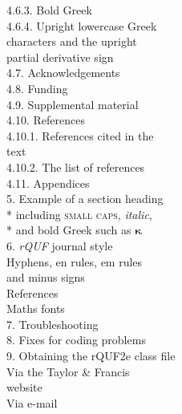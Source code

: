 \documentclass{rQUF2e}
\theoremstyle{plain}
\theoremstyle{definition}
\theoremstyle{remark}
\begin{document}
{{{\hspace*{24pt} {4.6.3.}  Bold Greek\\
\hspace*{24pt} {4.6.4.}  Upright lowercase Greek\\
\hspace*{52pt}           characters and the upright\\
\hspace*{52pt}           partial derivative sign  \\}
\hspace{-24pt}\vbox{\noindent{}
\hspace*{7pt} {4.7.}   Acknowledgements \\
\hspace*{7pt} {4.8.}   Funding \\
\hspace*{7pt} {4.9.}   Supplemental material \\
\hspace*{7pt} {4.10.}   References \\
\hspace*{24pt} {4.10.1.}   References cited in the \\ \hspace*{56pt}text  \\
\hspace*{24pt} {4.10.2.}   The list of references\\
\hspace*{7pt} {4.11.}   Appendices \\
{5.}    Example of a section heading \\*
\hspace*{8pt} including {\scshape{small caps}}, {\it italic},\\*
\hspace*{8pt}  and bold Greek such as ${\bm\kappa}$ \\
{6.}   {\em rQUF} journal style \\
\hspace*{10pt}{6.1.}   Hyphens, en rules, em rules \\
\hspace*{27pt} and minus signs\\
\hspace*{10pt}{6.2.}   References \\
\hspace*{10pt}{6.3.}   Maths fonts\\
{7.}   Troubleshooting\\
{8.}  Fixes for coding problems\\
{9.}   Obtaining the rQUF2e class file\\
\hspace*{10pt}{9.1}  Via the Taylor \& Francis\\
\hspace*{27pt} website\\
\hspace*{10pt}{9.2}  Via e-mail\\\\}}}
\end{document}
